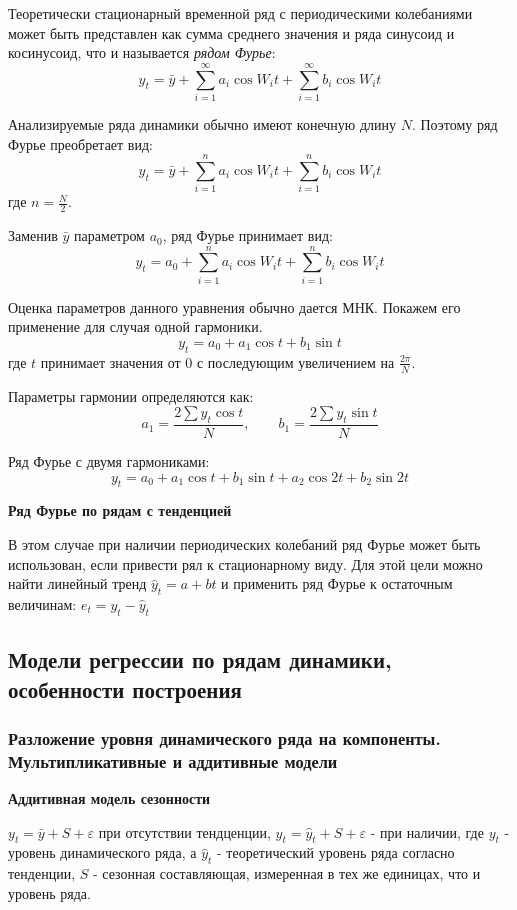 \documentclass[aps,%
12pt,%
final,%
oneside,
onecolumn,%
musixtex, %
superscriptaddress,%
centertags]{article} %
\theoremstyle{plain}
\theoremstyle{definition}
\theoremstyle{remark}
\begin{document}
Теоретически стационарный временной ряд с периодическими колебаниями может быть представлен как сумма среднего значения и ряда синусоид и косинусоид, что и называется \textit{рядом Фурье}:
$$y_t = \bar{y} + \sum\limits_{i=1}^{\infty}a_i \cos W_it + \sum\limits_{i=1}^{\infty}b_i \cos W_it$$

Анализируемые ряда динамики обычно имеют конечную длину $N$. Поэтому ряд Фурье преобретает вид:
$$y_t = \bar{y} + \sum\limits_{i=1}^{n}a_i \cos W_it + \sum\limits_{i=1}^{n}b_i \cos W_it$$
где $n = \frac{N}{2}$.

Заменив $\bar{y}$ параметром $a_0$, ряд Фурье принимает вид:
$$y_t = a_0 +  \sum\limits_{i=1}^{n}a_i \cos W_it + \sum\limits_{i=1}^{n}b_i \cos W_it$$

Оценка параметров данного уравнения обычно дается МНК. Покажем его применение для случая одной гармоники.
$$y_t = a_0 + a_1 \cos t + b_1 \sin t$$
где $t$ принимает значения от $0$ с последующим увеличением на $\frac{2\pi}{N}$.

Параметры гармонии определяются как:
$$a_1 = \frac{2\sum\limits y_t \cos t}{N}, \qquad b_1 = \frac{2\sum\limits y_t \sin t}{N}$$

Ряд Фурье с двумя гармониками:
$$y_t =  a_0 + a_1 \cos t + b_1 \sin t + a_2 \cos 2t + b_2 \sin 2t$$

\textbf{Ряд Фурье по рядам с тенденцией}

В этом случае при наличии периодических колебаний ряд Фурье может быть использован, если привести рял к стационарному виду. Для этой цели можно найти линейный тренд $\hat{y}_t = a + bt$ и применить ряд Фурье к остаточным величинам:
$e_t = y_t  -\hat{y}_t$

\newpage
\subsection{Модели регрессии по рядам динамики, особенности построения}

\subsubsection{Разложение уровня динамического ряда на компоненты. Мультипликативные и аддитивные модели}

\textbf{Аддитивная модель сезонности}

$y_t = \bar{y} + S + \varepsilon$ при отсутствии тендценции, $y_t = \hat{y}_t + S + \varepsilon$ - при наличии, где $y_t$ - уровень динамического ряда, а $\hat{y}_t$ - теоретический уровень ряда согласно тенденции, $S$ - сезонная составляющая, измеренная в тех же единицах, что и уровень ряда.
\end{document}
